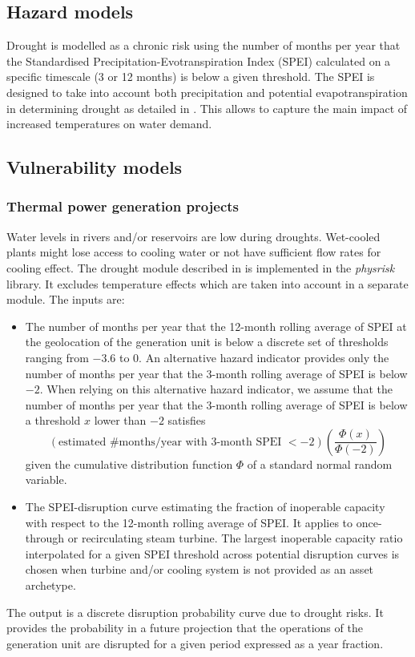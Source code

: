 \documentclass[a4paper,11pt]{extarticle} %
\theoremstyle{definition}
\begin{document}
\subsection{Hazard models}
Drought is modelled as a chronic risk using the number of months per year that the Standardised Precipitation-Evotranspiration Index (SPEI) calculated on a specific timescale (3 or 12 months) is below a given threshold. The SPEI is designed to take into account both precipitation and potential evapotranspiration in determining drought as detailed in \cite{VicenteSerranoEtAl:2010}. This allows to capture the main impact of increased temperatures on water demand.

\subsection{Vulnerability models}

\subsubsection{Thermal power generation projects}
Water levels in rivers and/or reservoirs are low during droughts. Wet-cooled plants might lose access to cooling water or not have sufficient flow rates for cooling effect. The drought module described in \cite{LuoEtAl:2021,LuoEtAl:2023} is implemented in the \emph{physrisk} library. It excludes temperature effects which are taken into account in a separate module. The inputs are:
\begin{itemize}
\item The number of months per year that the 12-month rolling average of SPEI at the geolocation of the generation unit is below a discrete set of thresholds ranging from $-3.6$ to $0$. An alternative hazard indicator provides only the number of months per year that the 3-month rolling average of SPEI is below $-2$. When relying on this alternative hazard indicator, we assume that the number of months per year that the 3-month rolling average of SPEI is below a threshold $x$ lower than $-2$ satisfies
$$
\left(\text{estimated \#months/year with 3-month SPEI $<-2$}\right)\left(\frac{\Phi\left(x\right)}{\Phi\left(-2\right)}\right)
$$
given the cumulative distribution function $\Phi$ of a standard normal random variable.
\item The SPEI-disruption curve estimating the fraction of inoperable capacity with respect to the 12-month rolling average of SPEI. It applies to once-through or recirculating steam turbine. The largest inoperable capacity ratio interpolated for a given SPEI threshold across potential disruption curves is chosen when turbine and/or cooling system is not provided as an asset archetype.
\end{itemize}
The output is a discrete disruption probability curve due to drought risks. It provides the probability in a future projection that the operations of the generation unit are disrupted for a given period expressed as a year fraction.
\end{document}
